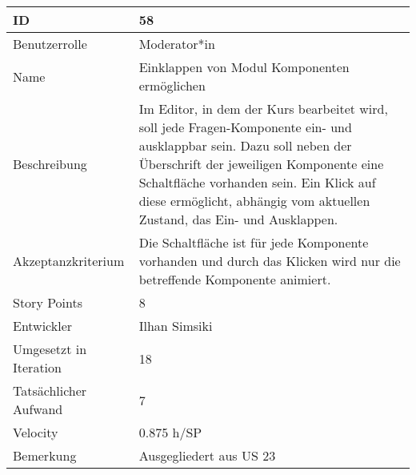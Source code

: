 \begin{tabularx}{\textwidth}{|p{}|X|}
	\hline
	ID & 58\\
	\hline
	Benutzerrolle & Moderator*in\\
	\hline
	Name & Einklappen von Modul Komponenten ermöglichen\\
	\hline
	Beschreibung & Im Editor, in dem der Kurs bearbeitet wird, soll jede Fragen-Komponente ein- und ausklappbar sein.
		Dazu soll neben der Überschrift der jeweiligen Komponente eine Schaltfläche vorhanden sein.
		Ein Klick auf diese ermöglicht, abhängig vom aktuellen Zustand, das Ein- und Ausklappen.\\
	\hline
	Akzeptanzkriterium & Die Schaltfläche ist für jede Komponente vorhanden und durch das Klicken wird nur die betreffende Komponente animiert.\\
	\hline
	Story Points & 8\\
	\hline
	Entwickler & Ilhan Simsiki\\
	\hline
	Umgesetzt in Iteration & 18\\
	\hline
	Tatsächlicher Aufwand & 7\\
	\hline
	Velocity & 0.875 h/SP\\
	\hline
	Bemerkung & Ausgegliedert aus US 23\\
	\hline
\end{tabularx}
\vspace{20pt}
